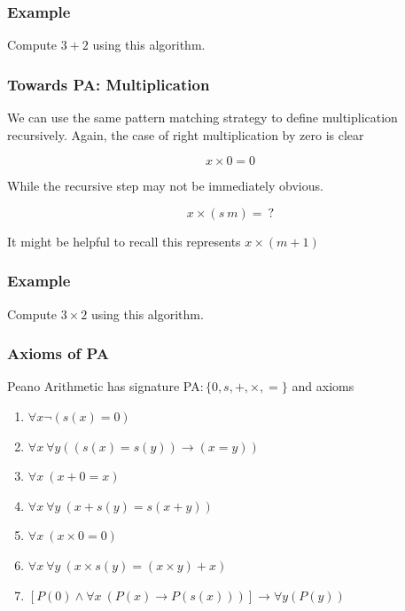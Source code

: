 \documentclass{beamer}
\theoremstyle{indentDefn} \newtheorem{defn}[]{Definition}
\begin{document}
\begin{frame}
	\frametitle{Example}

	Compute $3 + 2$ using this algorithm. 

	\vspace{60mm}

\end{frame}

\begin{frame}
	\frametitle{Towards PA: Multiplication}

	We can use the same pattern matching strategy to define multiplication recursively. Again, the case of right multiplication by zero is clear

	$$x \times 0 = 0$$

	While the recursive step may not be immediately obvious.

	$$x \times (s \ m) = \ ?$$

	It might be helpful to recall this represents $x \times (m + 1)$

	\vspace{2cm}

\end{frame}

\begin{frame}
	\frametitle{Example}

	Compute $3 \times 2$ using this algorithm. 

	\vspace{6cm}

\end{frame} 

\begin{frame}
	\frametitle{Axioms of PA}
	
	Peano Arithmetic has signature PA$: \{0, s, +, \times, =\}$ and axioms
	
	\begin{enumerate}
		\item $\forall x \lnot(s(x) = 0)$
		\item $\forall x \ \forall y ((s(x) = s(y)) \to (x = y))$		\item $\forall x \ (x + 0 = x)$
		\item $\forall x \ \forall y \ (x + s(y) = s(x + y))$
		\item $\forall x \ (x \times 0 = 0)$
		\item $\forall x \ \forall y \ (x \times s(y) = (x \times y) + x)$
		\item $[P(0) \land \forall x \ (P(x) \to P(s(x)))] \rightarrow \forall y (P(y))$
	\end{enumerate}

\end{frame}
\end{document}
